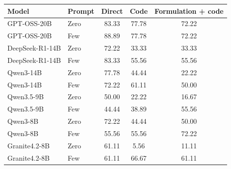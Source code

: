 \begin{tabular}{llccc}
\toprule
Model & Prompt & Direct & Code & Formulation + code \\
\midrule
GPT-OSS-20B & Zero & 83.33 & 77.78 & 72.22 \\
GPT-OSS-20B & Few & 88.89 & 77.78 & 72.22 \\
DeepSeek-R1-14B & Zero & 72.22 & 33.33 & 33.33 \\
DeepSeek-R1-14B & Few & 83.33 & 55.56 & 55.56 \\
Qwen3-14B & Zero & 77.78 & 44.44 & 22.22 \\
Qwen3-14B & Few & 72.22 & 61.11 & 50.00 \\
Qwen3.5-9B & Zero & 50.00 & 22.22 & 16.67 \\
Qwen3.5-9B & Few & 44.44 & 38.89 & 55.56 \\
Qwen3-8B & Zero & 72.22 & 44.44 & 50.00 \\
Qwen3-8B & Few & 55.56 & 55.56 & 72.22 \\
Granite4.2-8B & Zero & 61.11 & 5.56 & 11.11 \\
Granite4.2-8B & Few & 61.11 & 66.67 & 61.11 \\
\bottomrule
\end{tabular}
